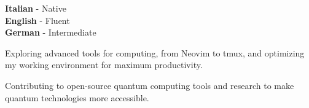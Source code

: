 \documentclass[9pt]{developercv} %
\begin{document}
\begin{minipage}[t]{0.3\textwidth} %
	\vspace{-\baselineskip} %

	
	\textbf{Italian} - Native\\
	\textbf{English} - Fluent\\
	\textbf{German} - Intermediate
\end{minipage}
\hfill %
\begin{minipage}[t]{0.3\textwidth} %
	\vspace{-\baselineskip} %
	
	
	Exploring advanced tools for computing, from Neovim to tmux, and optimizing my working environment for maximum productivity.
\end{minipage}
\hfill %
\begin{minipage}[t]{0.3\textwidth} %
	\vspace{-\baselineskip} %
	
	
	Contributing to open-source quantum computing tools and research to make quantum technologies more accessible.
\end{minipage}

\end{document}
